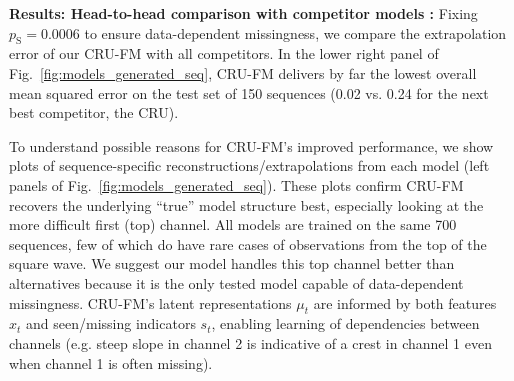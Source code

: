 




\textbf{Results: Head-to-head comparison with competitor models :}
Fixing $p_{\text{S}} = 0.0006$ to ensure data-dependent missingness, we compare the extrapolation error of our CRU-FM with all competitors.
In the lower right panel of Fig.~\ref{fig:models_generated_seq},
CRU-FM delivers by far the lowest overall mean squared error on the test set of 150 sequences (0.02 vs. 0.24 for the next best competitor, the CRU). 

To understand possible reasons for CRU-FM's improved performance, we show plots of sequence-specific reconstructions/extrapolations from each model 
(left panels of Fig.~\ref{fig:models_generated_seq}).
These plots confirm CRU-FM recovers the underlying ``true'' model structure best, especially looking at the more difficult first (top) channel.
All models are trained on the same 700 sequences, few of which do have rare cases of observations from the top of the square wave. 
We suggest our model handles this top channel better than alternatives because it is the only tested model capable of data-dependent missingness. 
CRU-FM's
 latent representations $\mu_t$ are informed by both features $x_t$ and seen/missing indicators $s_t$, enabling learning of dependencies between channels (e.g. steep slope in channel 2 is indicative of a crest in channel 1 even when channel 1 is often missing). 


